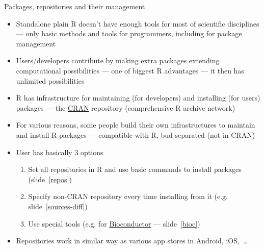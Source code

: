 \documentclass[compress, xelatex, 11pt, xcolor=svgnames, aspectratio=169, url={hyphens, lowtilde}]{beamer}
\begin{document}
\begin{frame}{Packages, repositories and their management}
	\begin{itemize}
		\item Standalone plain R doesn't have enough tools for most of scientific disciplines --- only basic methods and tools for programmers, including for package management
		\item Users/developers contribute by making extra packages extending computational possibilities --- one of biggest R advantages --- it then has unlimited possibilities
		\item R has infrastructure for maintaining (for developers) and installing (for users) packages --- the \href{https://CRAN.R-project.org/}{CRAN} repository (comprehensive R archive network)
		\item For various reasons, some people build their own infrastructures to maintain and install R packages --- compatible with R, bud separated (not in CRAN)
		\item User has basically 3 options
		\begin{enumerate}
			\item Set all repositories in R and use basic commands to install packages (slide~\ref{repos})
			\item Specify non-CRAN repository every time installing from it (e.g. slide~\ref{sources-diff})
			\item Use special tools (e.g. for \href{https://bioconductor.org/install/}{Bioconductor} --- slide~\ref{bioc})
		\end{enumerate}
		\item Repositories work in similar way as various app stores in Android, iOS,~\ldots
	\end{itemize}
\end{frame}
\end{document}
